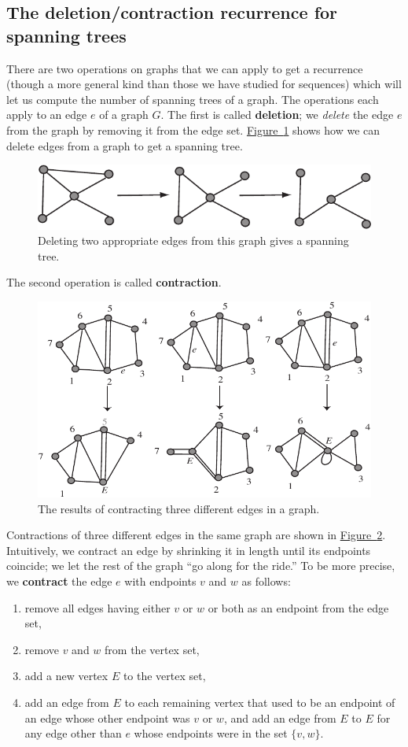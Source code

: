 \documentclass[10pt,]{book}
\newcommand{\terminology}[1]{\textbf{#1}}
\theoremstyle{plain}
\theoremstyle{definition}
\theoremstyle{definition}
\numberwithin{equation}{chapter}
\begin{document}
\subsection[{The deletion/contraction recurrence for spanning trees}]{The deletion/contraction recurrence for spanning trees}\label{subsection-26}
There are two operations on graphs that we can apply to get a recurrence (though a more general kind than those we have studied for sequences) which will let us compute the number of spanning trees of a graph. The operations each apply to an edge \(e\) of a graph \(G\). The first is called \terminology{deletion}; we \emph{delete} the edge \(e\) from the graph by removing it from the edge set. \hyperref[twodeletions]{Figure~\ref{twodeletions}} shows how we can delete edges from a graph to get a spanning tree.%
\begin{figure}
\centering
\includegraphics[width=0.6\linewidth]{images/twodeletions}
\caption{Deleting two appropriate edges from this graph gives a spanning tree.\label{twodeletions}}
\end{figure}
The second operation is called \terminology{contraction}.%
\begin{figure}
\centering
\includegraphics[width=0.65\linewidth]{images/threecontractions}
\caption{The results of contracting three different edges in a graph.\label{threecontractions}}
\end{figure}
Contractions of three different edges in the same graph are shown in \hyperref[threecontractions]{Figure~\ref{threecontractions}}. Intuitively, we contract an edge by shrinking it in length until its endpoints coincide; we let the rest of the graph ``go along for the ride.'' To be more precise, we \terminology{contract} the edge \(e\) with endpoints \(v\) and \(w\) as follows: \leavevmode%
\begin{enumerate}
\item\hypertarget{li-20}{}remove all edges having either \(v\) or \(w\) or both as an endpoint from the edge set,%
\item\hypertarget{li-21}{}remove \(v\) and \(w\) from the vertex set,%
\item\hypertarget{li-22}{}add a new vertex \(E\) to the vertex set,%
\item\hypertarget{li-23}{}add an edge from \(E\) to each remaining vertex that used to be an endpoint of an edge whose other endpoint was \(v\) or \(w\), and add an edge from \(E\) to \(E\) for any edge other than \(e\) whose endpoints were in the set \(\{v,w\}\).%
\end{enumerate}
\end{document}
